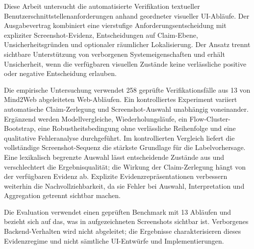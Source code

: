 
Diese Arbeit untersucht die automatisierte Verifikation textueller
Benutzerschnittstellenanforderungen anhand geordneter visueller UI-Abläufe. Der
Ausgabevertrag kombiniert eine vierstufige Anforderungsentscheidung mit
expliziter Screenshot-Evidenz, Entscheidungen auf Claim-Ebene,
Unsicherheitsgründen und optionaler räumlicher Lokalisierung. Der Ansatz trennt
sichtbare Unterstützung von verborgenen Systemeigenschaften und erhält
Unsicherheit, wenn die verfügbaren visuellen Zustände keine verlässliche
positive oder negative Entscheidung erlauben.

Die empirische Untersuchung verwendet 258 geprüfte Verifikationsfälle aus 13
von Mind2Web abgeleiteten Web-Abläufen. Ein kontrolliertes Experiment variiert
automatische Claim-Zerlegung und Screenshot-Auswahl unabhängig voneinander.
Ergänzend werden Modellvergleiche, Wiederholungsläufe, ein
Flow-Cluster-Bootstrap, eine Robustheitsbedingung ohne verlässliche Reihenfolge
und eine qualitative Fehleranalyse durchgeführt. Im kontrollierten Vergleich
liefert die vollständige Screenshot-Sequenz die stärkste Grundlage für die
Labelvorhersage. Eine lexikalisch begrenzte Auswahl lässt entscheidende
Zustände aus und verschlechtert die Ergebnisqualität; die Wirkung der
Claim-Zerlegung hängt von der verfügbaren Evidenz ab. Explizite
Evidenzrepräsentationen verbessern weiterhin die Nachvollziehbarkeit, da sie
Fehler bei Auswahl, Interpretation und Aggregation getrennt sichtbar machen.

Die Evaluation verwendet einen geprüften Benchmark mit 13 Abläufen und
bezieht sich auf das, was in aufgezeichneten Screenshots sichtbar ist.
Verborgenes Backend-Verhalten wird nicht abgeleitet; die Ergebnisse
charakterisieren dieses Evidenzregime und nicht sämtliche UI-Entwürfe und
Implementierungen.

